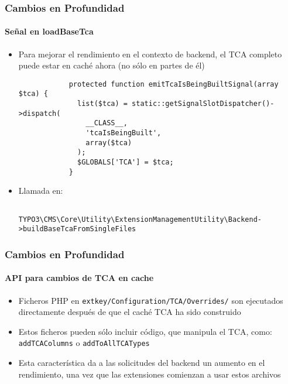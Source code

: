 \begin{frame}[fragile]
	\frametitle{Cambios en Profundidad}
	\framesubtitle{Señal en loadBaseTca}

	\lstset{
		basicstyle=\tiny\ttfamily
	}

	\begin{itemize}
		\item Para mejorar el rendimiento en el contexto de backend, el TCA completo puede estar en caché ahora (no sólo en partes de él)

		\begin{lstlisting}
			protected function emitTcaIsBeingBuiltSignal(array $tca) {
			  list($tca) = static::getSignalSlotDispatcher()->dispatch(
			    __CLASS__,
			    'tcaIsBeingBuilt',
			    array($tca)
			  );
			  $GLOBALS['TCA'] = $tca;
			}
		\end{lstlisting}

		\item Llamada en:

			\begin{lstlisting}
				TYPO3\CMS\Core\Utility\ExtensionManagementUtility\Backend->buildBaseTcaFromSingleFiles
			\end{lstlisting}

	\end{itemize}

\end{frame}  


\begin{frame}[fragile]
	\frametitle{Cambios en Profundidad}
	\framesubtitle{API para cambios de TCA en cache}

	\begin{itemize}
		\item Ficheros PHP en \texttt{extkey/Configuration/TCA/Overrides/}
			son ejecutados directamente después de que el caché TCA ha sido construido

		\item Estos ficheros pueden sólo incluir código, que manipula el TCA,\newline
			como: \texttt{addTCAColumns} o \texttt{addToAllTCATypes}

		\item Esta característica da a las solicitudes del backend un aumento en el rendimiento, una vez que las extensiones comienzan a usar estos archivos

	\end{itemize}

\end{frame} 

